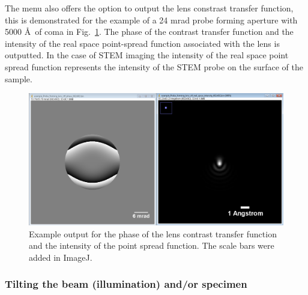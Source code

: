 \documentclass[12pt,a4paper]{article}
\begin{document}
The menu also offers the option to output the lens constrast transfer function, this is demonstrated for the example of a 24 mrad probe forming aperture with 5000 \AA\ of coma in Fig.~\ref{fig:aberrations}. The phase of the contrast transfer function and the intensity of the real space point-spread function associated with the lens is outputted. In the case of STEM imaging the intensity of the real space point spread function represents the intensity of the STEM probe on the surface of the sample.
%
\begin{figure}[!h]
	\begin{center}
		\includegraphics[width=\textwidth]{aberrations.png}
		\caption{Example output for the phase of the lens contrast transfer function and the intensity of the point spread function. The scale bars were added in ImageJ.}
		\label{fig:aberrations}
	\end{center}
\end{figure}

\subsubsection{Tilting the beam (illumination) and/or specimen}
\end{document}
